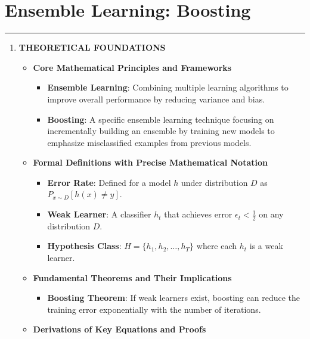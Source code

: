\documentclass[
  12pt,
]{report}
\providecommand{\tightlist}{%
  \setlength{\itemsep}{0pt}\setlength{\parskip}{0pt}}
\begin{document}
\chapter{Ensemble Learning: Boosting}

\begin{center}\rule{0.5\linewidth}{0.5pt}\end{center}

\begin{enumerate}
\def\labelenumi{\arabic{enumi}.}
\item
  \textbf{THEORETICAL FOUNDATIONS}

  \begin{itemize}
  \tightlist
  \item
    \textbf{Core Mathematical Principles and Frameworks}

    \begin{itemize}
    \tightlist
    \item
      \textbf{Ensemble Learning}: Combining multiple learning algorithms to improve overall performance by reducing variance and bias.
    \item
      \textbf{Boosting}: A specific ensemble learning technique focusing on incrementally building an ensemble by training new models to emphasize misclassified examples from previous models.
    \end{itemize}
  \item
    \textbf{Formal Definitions with Precise Mathematical Notation}

    \begin{itemize}
    \tightlist
    \item
      \textbf{Error Rate}: Defined for a model \(h\) under distribution \(D\) as \(P_{x \sim D}[h(x) \neq y]\).
    \item
      \textbf{Weak Learner}: A classifier \(h_t\) that achieves error \(\epsilon_t < \frac{1}{2}\) on any distribution \(D\).
    \item
      \textbf{Hypothesis Class}: \(H = \{h_1, h_2, \ldots, h_T\}\) where each \(h_t\) is a weak learner.
    \end{itemize}
  \item
    \textbf{Fundamental Theorems and Their Implications}

    \begin{itemize}
    \tightlist
    \item
      \textbf{Boosting Theorem}: If weak learners exist, boosting can reduce the training error exponentially with the number of iterations.
    \end{itemize}
  \item
    \textbf{Derivations of Key Equations and Proofs}


\end{itemize}
\end{enumerate}
\end{document}
